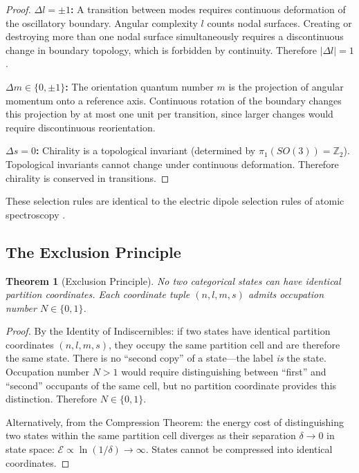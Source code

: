 \documentclass[11pt,twocolumn,a4paper]{article}
\newtheorem{theorem}{Theorem}[section]
\theoremstyle{definition}
\theoremstyle{remark}
\newcommand{\Integer}{\mathbb{Z}}
\begin{document}
\begin{proof}
\textbf{$\Delta l = \pm 1$:} A transition between modes requires continuous deformation of the oscillatory boundary. Angular complexity $l$ counts nodal surfaces. Creating or destroying more than one nodal surface simultaneously requires a discontinuous change in boundary topology, which is forbidden by continuity. Therefore $|\Delta l| = 1$.

\textbf{$\Delta m \in \{0, \pm 1\}$:} The orientation quantum number $m$ is the projection of angular momentum onto a reference axis. Continuous rotation of the boundary changes this projection by at most one unit per transition, since larger changes would require discontinuous reorientation.

\textbf{$\Delta s = 0$:} Chirality is a topological invariant (determined by $\pi_1(SO(3)) = \Integer_2$). Topological invariants cannot change under continuous deformation. Therefore chirality is conserved in transitions.
\end{proof}

These selection rules are identical to the electric dipole selection rules of atomic spectroscopy \citep{griffiths2018, herzberg1944}.

\subsection{The Exclusion Principle}

\begin{theorem}[Exclusion Principle]
\label{thm:exclusion}
No two categorical states can have identical partition coordinates. Each coordinate tuple $(n, l, m, s)$ admits occupation number $N \in \{0, 1\}$.
\end{theorem}

\begin{proof}
By the Identity of Indiscernibles: if two states have identical partition coordinates $(n, l, m, s)$, they occupy the same partition cell and are therefore the same state. There is no ``second copy'' of a state---the label \emph{is} the state. Occupation number $N > 1$ would require distinguishing between ``first'' and ``second'' occupants of the same cell, but no partition coordinate provides this distinction. Therefore $N \in \{0, 1\}$.

Alternatively, from the Compression Theorem: the energy cost of distinguishing two states within the same partition cell diverges as their separation $\delta \to 0$ in state space: $\mathcal{E} \propto \ln(1/\delta) \to \infty$. States cannot be compressed into identical coordinates.
\end{proof}
\end{document}
